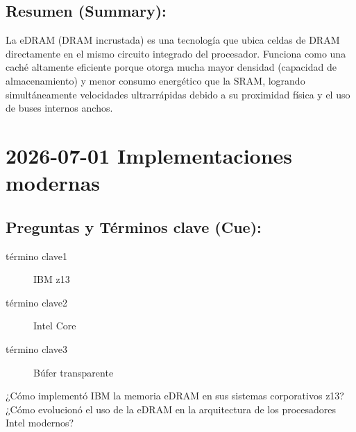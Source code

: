 \documentclass{article}
\begin{document}
\subsection{Resumen (Summary):}
\label{sec:org9d932dc}
La eDRAM (DRAM incrustada) es una tecnología que ubica celdas de DRAM
directamente en el mismo circuito integrado del procesador. Funciona
como una caché altamente eficiente porque otorga mucha mayor densidad
(capacidad de almacenamiento) y menor consumo energético que la SRAM, 
logrando simultáneamente velocidades ultrarrápidas debido a su 
proximidad física y el uso de buses internos anchos.

\section{2026-07-01 Implementaciones modernas}
\label{sec:orgcd0bb0c}

\subsection{Preguntas y Términos clave (Cue):}
\label{sec:org15ebd00}
\begin{description}
\item[{término clave1}] IBM z13
\item[{término clave2}] Intel Core
\item[{término clave3}] Búfer transparente
\item[{¿Cómo implementó IBM la memoria eDRAM en sus sistemas corporativos z13?}] 

\item[{¿Cómo evolucionó el uso de la eDRAM en la arquitectura de los procesadores Intel modernos?}] 
\end{description}
\end{document}
